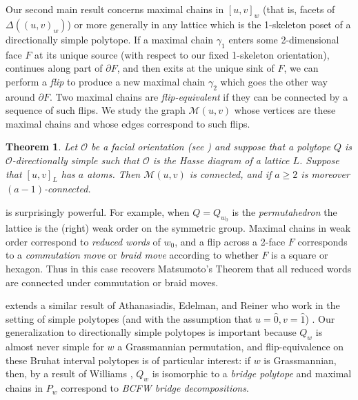 \documentclass[12pt]{amsart}
\theoremstyle{plain}
\newtheorem{thm}{Theorem}[section]
\theoremstyle{definition}
\theoremstyle{remark}
\begin{document}
Our second main result concerns maximal chains in $[u,v]_w$ (that is, facets of $\Delta((u,v)_w)$) or more generally in any lattice which is the 1-skeleton poset of a directionally simple polytope. If a maximal chain $\gamma_1$ enters some 2-dimensional face $F$ at its unique source (with respect to our fixed 1-skeleton orientation), continues along part of $\partial F$, and then 
exits at the unique sink of $F$, we can perform a \emph{flip} to produce a new maximal chain $\gamma_2$ which goes the other way around $\partial F$. Two maximal chains are \emph{flip-equivalent} if they can be connected by a sequence of such flips. We study the graph $\mathcal{M}(u,v)$ whose vertices are these maximal chains and whose edges correspond to such flips.

\begin{thm}
\label{thm:intro-moves}
Let $\mathcal{O}$ be a facial orientation (see ) and suppose that a polytope $Q$ is $\mathcal{O}$-directionally simple such that $\mathcal{O}$ is the Hasse diagram of a lattice $L$. Suppose that $[u,v]_L$ has $a$ atoms. Then $\mathcal{M}(u,v)$ is connected, and if $a \geq 2$ is moreover $(a-1)$-connected.
\end{thm}   

 is surprisingly powerful. For example, when $Q=Q_{w_0}$ is the \emph{permutahedron} the lattice is the (right) weak order on the symmetric group. Maximal chains in weak order correspond to \emph{reduced words} of $w_0$, and a flip across a 2-face $F$ corresponds to a \emph{commutation move} or \emph{braid move} according to whether $F$ is a square or hexagon. Thus in this case  recovers Matsumoto's Theorem \cite{matsumoto, tits} that all reduced words are connected under commutation or braid moves.

 extends a similar result of Athanasiadis, Edelman, and Reiner who work in the setting of simple polytopes (and with the assumption that $u=\hat{0}, v=\hat{1}$) \cite{AER}. Our generalization to directionally simple polytopes is important because $Q_w$ is almost never simple for $w$ a Grassmannian permutation, and flip-equivalence on these Bruhat interval polytopes is of particular interest: if $w$ is Grassmannian, then, by a result of Williams \cite{wi}, $Q_w$ is isomorphic to a \emph{bridge polytope} and maximal chains in $P_w$ correspond to \emph{BCFW bridge decompositions}.
 
\end{document}
